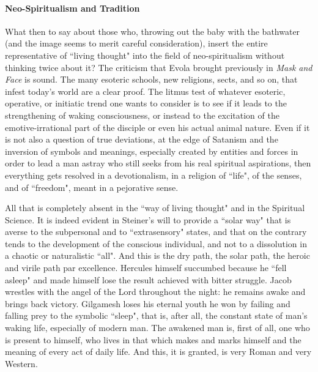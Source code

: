\paragraph{Neo-Spiritualism and Tradition}
What then to say about those who, throwing out the baby with the bathwater (and the image seems to merit careful consideration), insert the entire representative of ``living thought" into the field of neo-spiritualism without thinking twice about it? The criticism that Evola brought previously in \emph{Mask and Face} is sound. The many esoteric schools, new religions, sects, and so on, that infest today's world are a clear proof. The litmus test of whatever esoteric, operative, or initiatic trend one wants to consider is to see if it leads to the strengthening of waking consciousness, or instead to the excitation of the emotive-irrational part of the disciple or even his actual animal nature. Even if it is not also a question of true deviations, at the edge of Satanism and the inversion of symbols and meanings, especially created by entities and forces in order to lead a man astray who still seeks from his real spiritual aspirations, then everything gets resolved in a devotionalism, in a religion of ``life", of the senses, and of ``freedom", meant in a pejorative sense.

All that is completely absent in the ``way of living thought" and in the Spiritual Science. It is indeed evident in Steiner's will to provide a ``solar way" that is averse to the subpersonal and to ``extrasensory" states, and that on the contrary tends to the development of the conscious individual, and not to a dissolution in a chaotic or naturalistic ``all". And this is the dry path, the solar path, the heroic and virile path par excellence. Hercules himself succumbed because he ``fell asleep" and made himself lose the result achieved with bitter struggle. Jacob wrestles with the angel of the Lord throughout the night: he remains awake and brings back victory. Gilgamesh loses his eternal youth he won by failing and falling prey to the symbolic ``sleep", that is, after all, the constant state of man's waking life, especially of modern man. The awakened man is, first of all, one who is present to himself, who lives in that which makes and marks himself and the meaning of every act of daily life. And this, it is granted, is very Roman and very Western.

